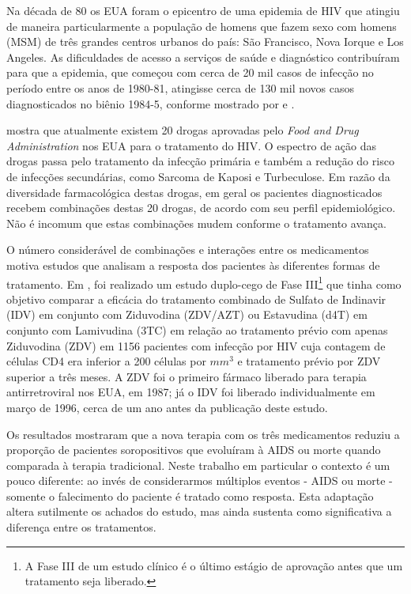 \documentclass[
	12pt,				%
	openright,			%
	twoside,			%
	a4paper,			%
	english,			%
	brazil				%
	]{abntex2}
\begin{document}
Na década de 80 os EUA foram o epicentro de uma epidemia de HIV que atingiu de maneira particularmente a população de homens que fazem sexo com homens (MSM) de três grandes centros urbanos do país: São Francisco, Nova Iorque e Los Angeles. As dificuldades de acesso a serviços de saúde e diagnóstico contribuíram para que a epidemia, que começou com cerca de 20 mil casos de infecção no período entre os anos de 1980-81, atingisse cerca de 130 mil novos casos diagnosticados no biênio 1984-5, conforme mostrado por \cite{el2010aids} e \cite{hall2008estimation}.

\cite{fauci2003hiv} mostra que atualmente existem 20 drogas aprovadas pelo \textit{Food and Drug Administration} nos EUA para o tratamento do HIV. O espectro de ação das drogas passa pelo tratamento da infecção primária e também a redução do risco de infecções secundárias, como Sarcoma de Kaposi e Turbeculose. Em razão da diversidade farmacológica destas drogas, em geral os pacientes diagnosticados recebem combinações destas 20 drogas, de acordo com seu perfil epidemiológico. Não é incomum que estas combinações mudem conforme o tratamento avança.

O número considerável de combinações e interações entre os medicamentos motiva estudos que analisam a resposta dos pacientes às diferentes formas de tratamento. Em \cite{hammer1997controlled}, foi realizado um estudo duplo-cego de Fase III\footnote{A Fase III de um estudo clínico é o último estágio de aprovação antes que um tratamento seja liberado.} que tinha como objetivo comparar a eficácia do tratamento combinado de Sulfato de Indinavir (IDV) em conjunto com Ziduvodina (ZDV/AZT) ou Estavudina (d4T) em conjunto com Lamivudina (3TC) em relação ao tratamento prévio com apenas Ziduvodina (ZDV) em 1156 pacientes com infecção por HIV cuja contagem de células CD4 era inferior a 200 células por $mm^3$ e tratamento prévio por ZDV superior a três meses. A ZDV foi o primeiro fármaco liberado para terapia antirretroviral nos EUA, em 1987; já o IDV foi liberado individualmente em março de 1996, cerca de um ano antes da publicação deste estudo. 

Os resultados mostraram que a nova terapia com os três medicamentos reduziu a proporção de pacientes soropositivos que evoluíram à AIDS ou morte quando comparada à terapia tradicional. Neste trabalho em particular o contexto é um pouco diferente: ao invés de considerarmos múltiplos eventos - AIDS ou morte - somente o falecimento do paciente é tratado como resposta. Esta adaptação altera sutilmente os achados do estudo, mas ainda sustenta como significativa a diferença entre os tratamentos.
\end{document}
